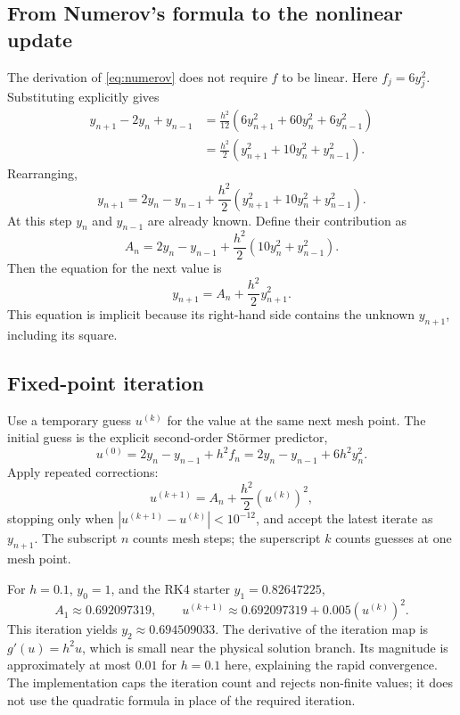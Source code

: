 \documentclass[11pt,a4paper]{article}
\newcommand{\St}{St\"ormer}
\begin{document}
\subsection{From Numerov's formula to the nonlinear update}
The derivation of \eqref{eq:numerov} does not require $f$ to be linear.
Here $f_j=6y_j^2$. Substituting explicitly gives
\begin{align*}
y_{n+1}-2y_n+y_{n-1}
&=\frac{h^2}{12}\left(6y_{n+1}^2+60y_n^2+6y_{n-1}^2\right)\\
&=\frac{h^2}{2}\left(y_{n+1}^2+10y_n^2+y_{n-1}^2\right).
\end{align*}
Rearranging,
\begin{equation}
\boxed{y_{n+1}=2y_n-y_{n-1}
+\frac{h^2}{2}\left(y_{n+1}^2+10y_n^2+y_{n-1}^2\right).}
\end{equation}
At this step $y_n$ and $y_{n-1}$ are already known. Define their contribution as
\[
A_n=2y_n-y_{n-1}+\frac{h^2}{2}\left(10y_n^2+y_{n-1}^2\right).
\]
Then the equation for the next value is
\begin{equation}
\boxed{y_{n+1}=A_n+\frac{h^2}{2}y_{n+1}^2.}
\label{eq:nonlinear}
\end{equation}
This equation is implicit because its right-hand side contains the unknown
$y_{n+1}$, including its square.

\subsection{Fixed-point iteration}
Use a temporary guess $u^{(k)}$ for the value at the same next mesh point.
The initial guess is the explicit second-order \St{} predictor,
\[
u^{(0)}=2y_n-y_{n-1}+h^2f_n
=2y_n-y_{n-1}+6h^2y_n^2.
\]
Apply repeated corrections:
\begin{equation}
\boxed{u^{(k+1)}=A_n+\frac{h^2}{2}\left(u^{(k)}\right)^2,}
\end{equation}
stopping only when $|u^{(k+1)}-u^{(k)}|<10^{-12}$, and accept the latest
iterate as $y_{n+1}$. The subscript $n$ counts mesh steps; the superscript
$k$ counts guesses at one mesh point.

For $h=0.1$, $y_0=1$, and the RK4 starter $y_1=0.82647225$,
\[
A_1\approx0.692097319,\qquad
u^{(k+1)}\approx0.692097319+0.005\left(u^{(k)}\right)^2.
\]
This iteration yields $y_2\approx0.694509033$.
The derivative of the iteration map is $g'(u)=h^2u$, which is small near
the physical solution branch. Its magnitude is approximately at most $0.01$
for $h=0.1$ here, explaining the rapid convergence.
The implementation caps the iteration count and rejects non-finite values;
it does not use the quadratic formula in place of the required iteration.
\end{document}
